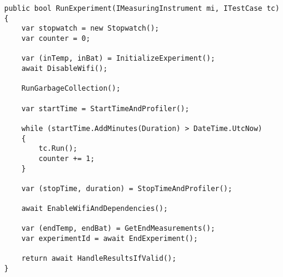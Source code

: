 

\begin{lstlisting}[caption=The method running the test case, label={lst:run_experiments}]
public bool RunExperiment(IMeasuringInstrument mi, ITestCase tc)
{
    var stopwatch = new Stopwatch();
    var counter = 0;

    var (inTemp, inBat) = InitializeExperiment();
    await DisableWifi();

    RunGarbageCollection();

    var startTime = StartTimeAndProfiler();

    while (startTime.AddMinutes(Duration) > DateTime.UtcNow)
    {
        tc.Run();
        counter += 1;
    }

    var (stopTime, duration) = StopTimeAndProfiler();

    await EnableWifiAndDependencies();

    var (endTemp, endBat) = GetEndMeasurements();
    var experimentId = await EndExperiment();

    return await HandleResultsIfValid();
}
    \end{lstlisting}